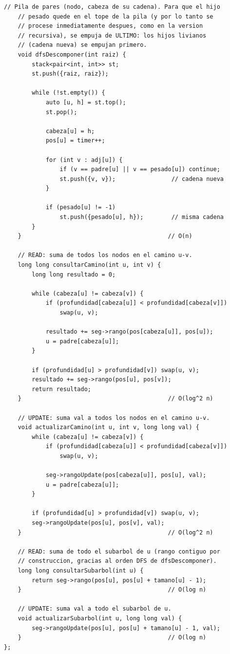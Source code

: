 \documentclass[10pt,a4paper,twocolumn]{article}
\begin{document}
\begin{lstlisting}[style=cpp]
    // Pila de pares (nodo, cabeza de su cadena). Para que el hijo
    // pesado quede en el tope de la pila (y por lo tanto se
    // procese inmediatamente despues, como en la version
    // recursiva), se empuja de ULTIMO: los hijos livianos
    // (cadena nueva) se empujan primero.
    void dfsDescomponer(int raiz) {
        stack<pair<int, int>> st;
        st.push({raiz, raiz});

        while (!st.empty()) {
            auto [u, h] = st.top();
            st.pop();

            cabeza[u] = h;
            pos[u] = timer++;

            for (int v : adj[u]) {
                if (v == padre[u] || v == pesado[u]) continue;
                st.push({v, v});                // cadena nueva
            }

            if (pesado[u] != -1)
                st.push({pesado[u], h});        // misma cadena
        }
    }                                          // O(n)

    // READ: suma de todos los nodos en el camino u-v.
    long long consultarCamino(int u, int v) {
        long long resultado = 0;

        while (cabeza[u] != cabeza[v]) {
            if (profundidad[cabeza[u]] < profundidad[cabeza[v]])
                swap(u, v);

            resultado += seg->rango(pos[cabeza[u]], pos[u]);
            u = padre[cabeza[u]];
        }

        if (profundidad[u] > profundidad[v]) swap(u, v);
        resultado += seg->rango(pos[u], pos[v]);
        return resultado;
    }                                          // O(log^2 n)

    // UPDATE: suma val a todos los nodos en el camino u-v.
    void actualizarCamino(int u, int v, long long val) {
        while (cabeza[u] != cabeza[v]) {
            if (profundidad[cabeza[u]] < profundidad[cabeza[v]])
                swap(u, v);

            seg->rangoUpdate(pos[cabeza[u]], pos[u], val);
            u = padre[cabeza[u]];
        }

        if (profundidad[u] > profundidad[v]) swap(u, v);
        seg->rangoUpdate(pos[u], pos[v], val);
    }                                          // O(log^2 n)

    // READ: suma de todo el subarbol de u (rango contiguo por
    // construccion, gracias al orden DFS de dfsDescomponer).
    long long consultarSubarbol(int u) {
        return seg->rango(pos[u], pos[u] + tamano[u] - 1);
    }                                          // O(log n)

    // UPDATE: suma val a todo el subarbol de u.
    void actualizarSubarbol(int u, long long val) {
        seg->rangoUpdate(pos[u], pos[u] + tamano[u] - 1, val);
    }                                          // O(log n)
};
\end{lstlisting}
\end{document}
